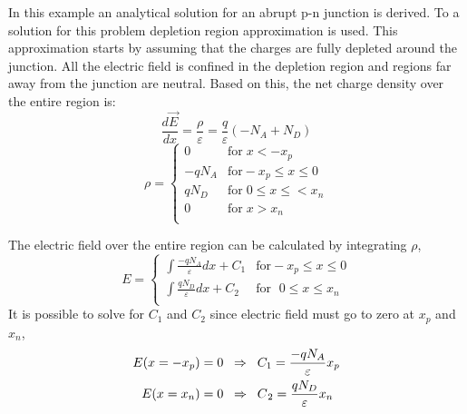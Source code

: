 \begin{doublespace}
In this example an analytical solution for an abrupt p-n junction is derived. To  a solution for this problem   depletion region approximation is used. This approximation starts by assuming that the charges are fully depleted around the junction\cite{Physem}. All the electric field is confined in the depletion region and regions far away from the junction are neutral. Based on this, the net charge density over the entire region is:
\begin{equation}
\frac{d \vec{E} }{dx}=\frac{\rho}{\varepsilon}=\frac{q}{\varepsilon}(-N_{A}+N_{D})
\end{equation}
\begin{equation}
\rho = \begin{cases}
         0 & \text{for} \;  x<-x_{p}\\
       -qN_{A} & \text{for}  -x_{p}\leq x \leq 0 \\
        qN_{D} & \text{for} \; 0 \leq x \leq< x_{n}  \\
        0 & \text{for}\;  x>x_{n} \\
     \end{cases}
\end{equation}

The electric field over the entire region can be calculated by integrating $\rho$,
\begin{equation}
E = \begin{cases}
       \int \frac{-qN_{A}}{\varepsilon}  dx+ C_{1} & \text{for}  -x_{p}\leq x \leq 0 \\
       \int \frac{qN_{D}}{\varepsilon} dx+ C_{2}   & \text{for } \; 0 \leq x \leq x_{n}  \\
     \end{cases}
\end{equation}
It is possible to solve for $C_{1}$ and $C_{2}$ since electric field must go to zero at $x_{p}$ and $x_{n}$,
\begin{eqnarray}
E(x=-x_{p}) & = 0  \; \;  \Rightarrow  \;\; C_{1}= \frac{-qN_{A}}{\varepsilon}x_{p}\nonumber \\
E(x=x_{n}) & =0  \; \;  \Rightarrow  \;\; C_{\tjsr{}{2}}= \frac{qN_{D}}{\varepsilon}x_{n}
\label{pn_efield}
\end{eqnarray}


\end{doublespace}
